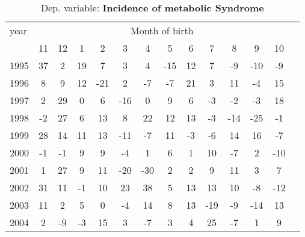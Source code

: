  \begin{table}[H] \begin{threeparttable} \centering \caption{Dep. variable: \textbf{Incidence of metabolic Syndrome}} {\def\sym#1{\ifmmode^{#1}\else\(^{#1}\)\fi} \begin{tabular}{l*{13}{c}} \toprule year & \multicolumn{12}{c}{Month of birth} \\ \cmidrule(lr){2-13} 
            &          11&          12&           1&           2&           3&           4&           5&           6&           7&           8&           9&          10\\
1995        &          37&           2&          19&           7&           3&           4&         -15&          12&           7&          -9&         -10&          -9\\
1996        &           8&           9&          12&         -21&           2&          -7&          -7&          21&           3&          11&          -4&          15\\
1997        &           2&          29&           0&           6&         -16&           0&           9&           6&          -3&          -2&          -3&          18\\
1998        &          -2&          27&           6&          13&           8&          22&          12&          13&          -3&         -14&         -25&          -1\\
1999        &          28&          14&          11&          13&         -11&          -7&          11&          -3&          -6&          14&          16&          -7\\
2000        &          -1&          -1&           9&           9&          -4&           1&           6&           1&          10&          -7&           2&         -10\\
2001        &           1&          27&           9&          11&         -20&         -30&           2&           2&           9&          11&           3&           7\\
2002        &          31&          11&          -1&          10&          23&          38&           5&          13&          13&          10&          -8&         -12\\
2003        &          11&           2&           5&           0&          -4&          14&           8&          13&         -19&          -9&         -14&          13\\
2004        &           2&          -9&          -3&          15&           3&          -7&           3&           4&          25&          -7&           1&           9\\

\end{tabular}}
\end{threeparttable}
\end{table}
